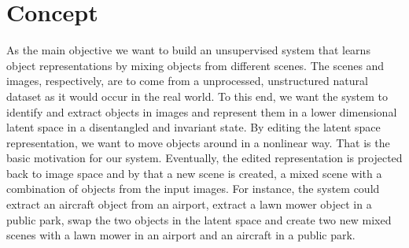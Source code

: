 \documentclass[a4paper,12pt]{report}
\begin{document}
\section{Concept}\label{subsec:concept}
As the main objective we want to build an unsupervised system that learns object representations by mixing objects from different scenes. The scenes and images, respectively, are to come from a unprocessed, unstructured natural dataset as it would occur in the real world. To this end, we want the system to identify and extract objects in images and represent them in a lower dimensional latent space in a disentangled and invariant state. By editing the latent space representation, we want to move objects around in a nonlinear way. That is the basic motivation for our system. Eventually, the edited representation is projected back to image space and by that a new scene is created, a mixed scene with a combination of objects from the input images. For instance, the system could extract an aircraft object from an airport, extract a lawn mower object in a public park, swap the two objects in the latent space and create two new mixed scenes with a lawn mower in an airport and an aircraft in a public park. 
\end{document}
